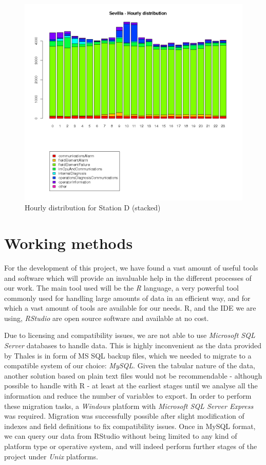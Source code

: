 \begin{figure}[htb]
 \centering
 \includegraphics[width=\textwidth]{./img/sevilla_timeline.png}
 \caption{Hourly distribution for Station D (stacked)} \label{fig:sevilla_timeline}
\end{figure}

\clearpage

\section{Working methods}
\label{sec:methods}
For the development of this project, we have found a vast amount of useful tools and software which will provide an invaluable help in the different processes of our work. The main tool used will be the \emph{R} language\cite{ihaka1996r}, a very powerful tool commonly used for handling large amounts of data in an efficient way, and for which a vast amount of tools are available for our needs. R, and the IDE we are using, \emph{RStudio}\cite{racine2012rstudio} are open source software and available at no cost.

Due to licensing and compatibility issues, we are not able to use \emph{Microsoft SQL Server} databases to handle data. This is highly inconvenient as the data provided by Thales is in form of MS SQL backup files, which we needed to migrate to a compatible system of our choice: \emph{MySQL}. Given the tabular nature of the data, another solution based on plain text files would not be recommendable - although possible to handle with R - at least at the earliest stages until we analyse all the information and reduce the number of variables to export. In order to perform these migration tasks, a \emph{Windows} platform with \emph{Microsoft SQL Server Express} was required. Migration was successfully possible after slight modification of indexes and field definitions to fix compatibility issues. Once in MySQL format, we can query our data from RStudio without being limited to any kind of platform type or operative system, and will indeed perform further stages of the project under \emph{Unix} platforms.

